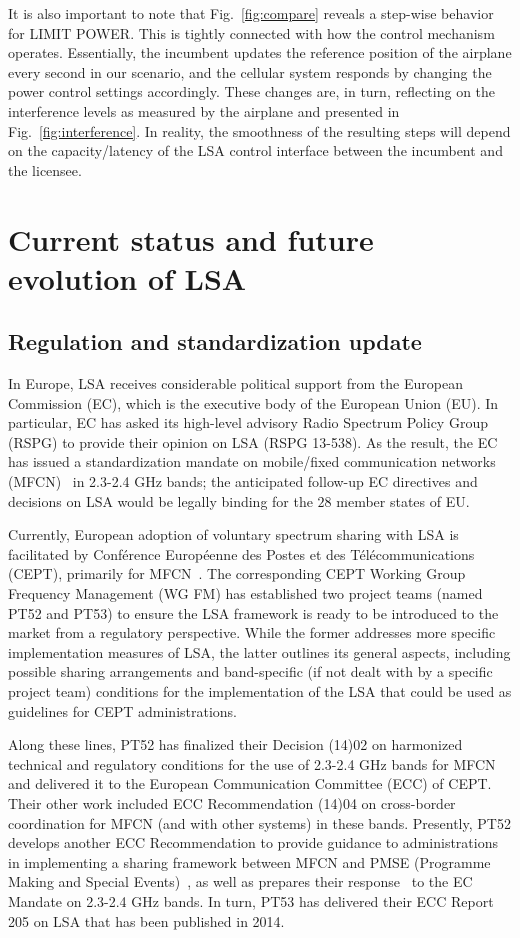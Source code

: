 \documentclass[journal]{IEEEtran}
\begin{document}
It is also important to note that Fig.~\ref{fig:compare} reveals a step-wise behavior for LIMIT POWER. This is tightly connected with how the control mechanism operates. Essentially, the incumbent updates the reference position of the airplane every second in our scenario, and the cellular system responds by changing the power control settings accordingly. These changes are, in turn, reflecting on the interference levels as measured by the airplane and presented in Fig.~\ref{fig:interference}. In reality, the smoothness of the resulting steps will depend on the capacity/latency of the LSA control interface between the incumbent and the licensee.


\section{Current status and future evolution of LSA}

\subsection{Regulation and standardization update}

In Europe, LSA receives considerable political support from the European Commission (EC), which is the executive body of the European Union (EU). In particular, EC has asked its high-level advisory Radio Spectrum Policy Group (RSPG) to provide their opinion on LSA (RSPG 13-538). As the result, the EC has issued a standardization mandate on mobile/fixed communication networks (MFCN)~\cite{EC} in 2.3-2.4 GHz bands; the anticipated follow-up EC directives and decisions on LSA would be legally binding for the $28$ member states of EU. 

Currently, European adoption of voluntary spectrum sharing with LSA is facilitated by Conf\'{e}rence Europ\'{e}enne des Postes et des T\'{e}l\'{e}communications (CEPT), primarily for MFCN~\cite{Gun14}. The corresponding CEPT Working Group Frequency Management (WG FM) has established two project teams (named PT52 and PT53) to ensure the LSA framework is ready to be introduced to the market from a regulatory perspective. While the former addresses more specific implementation measures of LSA, the latter outlines its general aspects, including possible sharing arrangements and band-specific (if not dealt with by a specific project team) conditions for the implementation of the LSA that could be used as guidelines for CEPT administrations. 

Along these lines, PT52 has finalized their Decision (14)02 on harmonized technical and regulatory conditions for the use of 2.3-2.4 GHz bands for MFCN and delivered it to the European Communication Committee (ECC) of CEPT. Their other work included ECC Recommendation (14)04 on cross-border coordination for MFCN (and with other systems) in these bands. Presently, PT52 develops another ECC Recommendation to provide guidance to administrations in implementing a sharing framework between MFCN and PMSE (Programme Making and Special Events)~\cite{Rec1}, as well as prepares their response~\cite{Rec2} to the EC Mandate on 2.3-2.4 GHz bands. In turn, PT53 has delivered their ECC Report 205 on LSA that has been published in 2014.
\end{document}

